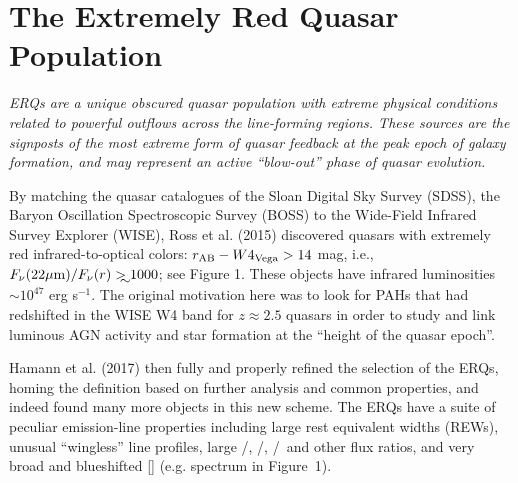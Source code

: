 \section*{The Extremely Red Quasar Population} 
{\it ERQs are a unique obscured quasar population with extreme
physical conditions related to powerful outflows across the
line-forming regions. These sources are the signposts of the most
extreme form of quasar feedback at the peak epoch of galaxy formation,
and may represent an active ``blow-out'' phase of quasar evolution.  }

\smallskip
\smallskip
\noindent
By matching the quasar catalogues of the Sloan Digital Sky Survey
(SDSS), the Baryon Oscillation Spectroscopic Survey (BOSS) to the
Wide-Field Infrared Survey Explorer (WISE), Ross et al. (2015)
discovered quasars with extremely red infrared-to-optical colors:
$r_{\rm AB}-W4_{\rm Vega}>14$ mag, i.e., $F_\nu({\rm 22\mu
m})/F_\nu(r) \gtrsim 1000$; see Figure 1. These objects have infrared
luminosities $\sim 10^{47}$ erg s$^{-1}$.  The original motivation
here was to look for PAHs that had redshifted in the WISE W4 band for
$z\approx2.5$ quasars in order to study and link luminous AGN activity
and star formation at the ``height of the quasar epoch''.

\smallskip
\smallskip
\noindent
Hamann et al. (2017) then fully and properly refined the selection of
the ERQs, homing the definition based on further analysis and common
properties, and indeed found many more objects in this new scheme. The
ERQs have a suite of peculiar emission-line properties including large
rest equivalent widths (REWs), unusual ``wingless'' line profiles,
large \nv /\lya , \nv /\civ , \siiv /\civ\ and other flux ratios, and
very broad and blueshifted [\oiii ]  (e.g. spectrum in
Figure~1).

